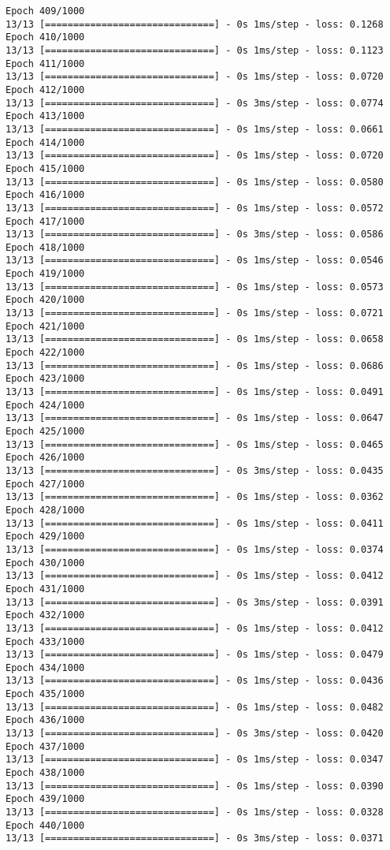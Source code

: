 \documentclass[11pt]{article}
\begin{document}
\begin{Verbatim}[commandchars=\\\{\}]
Epoch 409/1000
13/13 [==============================] - 0s 1ms/step - loss: 0.1268
Epoch 410/1000
13/13 [==============================] - 0s 1ms/step - loss: 0.1123
Epoch 411/1000
13/13 [==============================] - 0s 1ms/step - loss: 0.0720
Epoch 412/1000
13/13 [==============================] - 0s 3ms/step - loss: 0.0774
Epoch 413/1000
13/13 [==============================] - 0s 1ms/step - loss: 0.0661
Epoch 414/1000
13/13 [==============================] - 0s 1ms/step - loss: 0.0720
Epoch 415/1000
13/13 [==============================] - 0s 1ms/step - loss: 0.0580
Epoch 416/1000
13/13 [==============================] - 0s 1ms/step - loss: 0.0572
Epoch 417/1000
13/13 [==============================] - 0s 3ms/step - loss: 0.0586
Epoch 418/1000
13/13 [==============================] - 0s 1ms/step - loss: 0.0546
Epoch 419/1000
13/13 [==============================] - 0s 1ms/step - loss: 0.0573
Epoch 420/1000
13/13 [==============================] - 0s 1ms/step - loss: 0.0721
Epoch 421/1000
13/13 [==============================] - 0s 1ms/step - loss: 0.0658
Epoch 422/1000
13/13 [==============================] - 0s 1ms/step - loss: 0.0686
Epoch 423/1000
13/13 [==============================] - 0s 1ms/step - loss: 0.0491
Epoch 424/1000
13/13 [==============================] - 0s 1ms/step - loss: 0.0647
Epoch 425/1000
13/13 [==============================] - 0s 1ms/step - loss: 0.0465
Epoch 426/1000
13/13 [==============================] - 0s 3ms/step - loss: 0.0435
Epoch 427/1000
13/13 [==============================] - 0s 1ms/step - loss: 0.0362
Epoch 428/1000
13/13 [==============================] - 0s 1ms/step - loss: 0.0411
Epoch 429/1000
13/13 [==============================] - 0s 1ms/step - loss: 0.0374
Epoch 430/1000
13/13 [==============================] - 0s 1ms/step - loss: 0.0412
Epoch 431/1000
13/13 [==============================] - 0s 3ms/step - loss: 0.0391
Epoch 432/1000
13/13 [==============================] - 0s 1ms/step - loss: 0.0412
Epoch 433/1000
13/13 [==============================] - 0s 1ms/step - loss: 0.0479
Epoch 434/1000
13/13 [==============================] - 0s 1ms/step - loss: 0.0436
Epoch 435/1000
13/13 [==============================] - 0s 1ms/step - loss: 0.0482
Epoch 436/1000
13/13 [==============================] - 0s 3ms/step - loss: 0.0420
Epoch 437/1000
13/13 [==============================] - 0s 1ms/step - loss: 0.0347
Epoch 438/1000
13/13 [==============================] - 0s 1ms/step - loss: 0.0390
Epoch 439/1000
13/13 [==============================] - 0s 1ms/step - loss: 0.0328
Epoch 440/1000
13/13 [==============================] - 0s 3ms/step - loss: 0.0371

\end{Verbatim}
\end{document}

